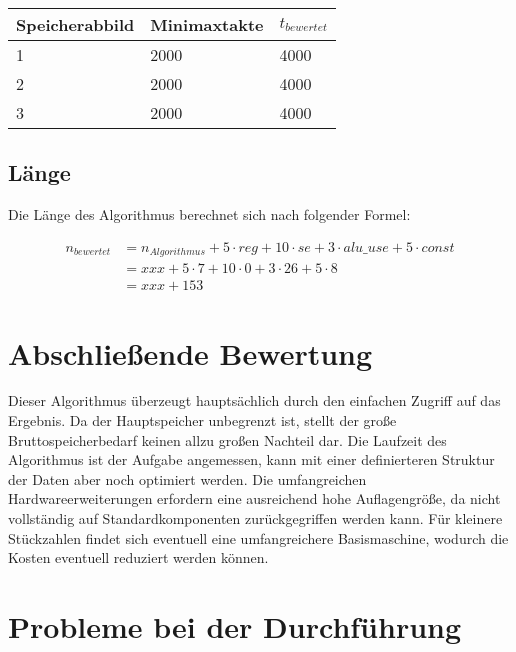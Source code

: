 \begin{center}
    \begin{tabular}{|l|l|l|}
        \hline
        Speicherabbild & Minimaxtakte & $t_{bewertet}$ \\
        \hline
        \hline
        1 & 2000 & 4000 \\
        \hline
        2 & 2000 & 4000 \\
        \hline
        3 & 2000 & 4000 \\
        \hline
    \end{tabular}
\end{center}

\subsection{Länge}
\label{subsection:Dokumentation-BenchmarkBewertung-Berechnung-Laenge}

Die Länge des Algorithmus berechnet sich nach folgender Formel:

\begin{align*}
    n_{bewertet} &= n_{Algorithmus} + 5 \cdot reg + 10 \cdot se + 3 \cdot alu\_use + 5 \cdot const \\
                 &= xxx + 5 \cdot 7 + 10 \cdot 0 + 3 \cdot 26 + 5 \cdot 8 \\
                 &= xxx + 153
\end{align*}

\section{Abschließende Bewertung}
\label{section:Dokumentation-BenchmarkBewertung-Bewertung}

Dieser Algorithmus überzeugt hauptsächlich durch den einfachen Zugriff auf das Ergebnis. Da der Hauptspeicher unbegrenzt ist, stellt der große Bruttospeicherbedarf keinen allzu großen Nachteil dar. Die Laufzeit des Algorithmus ist der Aufgabe angemessen, kann mit einer definierteren Struktur der Daten aber noch optimiert werden. Die umfangreichen Hardwareerweiterungen erfordern eine ausreichend hohe Auflagengröße, da nicht vollständig auf Standardkomponenten zurückgegriffen werden kann. Für kleinere Stückzahlen findet sich eventuell eine umfangreichere Basismaschine, wodurch die Kosten eventuell reduziert werden können.

\section{Probleme bei der Durchführung}
\label{section:Dokumentation-BenchmarkBewertung-Probleme}

